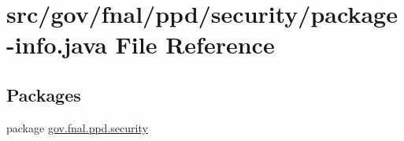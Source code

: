 \hypertarget{security_2package-info_8java}{\section{src/gov/fnal/ppd/security/package-\/info.java File Reference}
\label{security_2package-info_8java}
}
\subsection*{Packages}
\begin{DoxyCompactItemize}
\item 
package \hyperlink{namespacegov_1_1fnal_1_1ppd_1_1security}{gov.\-fnal.\-ppd.\-security}
\end{DoxyCompactItemize}
